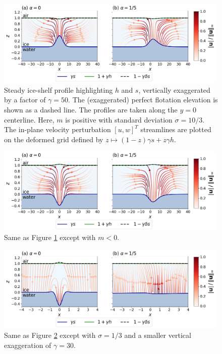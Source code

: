 \documentclass[paper=a4, fontsize=11pt]{article} %
\begin{document}
\begin{figure}
  \centering
\includegraphics[width=0.99\textwidth]{figs/fig8.png}
\caption{Steady ice-shelf profile highlighting $h$ and $s$, vertically exaggerated by
a factor of $\gamma=50$. The (exaggerated) perfect flotation elevation is shown
as a dashed line. The profiles are taken along the $y=0$ centerline.
Here, $m$ is positive with standard deviation $\sigma = 10/3$.
The in-plane velocity perturbation $[u,w]^T$ streamlines are
plotted on the deformed grid defined by $z\mapsto (1-z)\gamma s + z\gamma h$. }
\label{fig:channel}
\end{figure}

\begin{figure}
  \centering
\includegraphics[width=0.99\textwidth]{figs/fig9.png}
\caption{Same as Figure \ref{fig:channel} except with $m<0$. }
\label{fig:keel}
\end{figure}

\begin{figure}
  \centering
\includegraphics[width=0.99\textwidth]{figs/fig10.png}
\caption{Same as Figure \ref{fig:keel} except with $\sigma = 1/3$
and a smaller vertical exaggeration of $\gamma=30$.}
\label{fig:keel2}
\end{figure}
\end{document}
